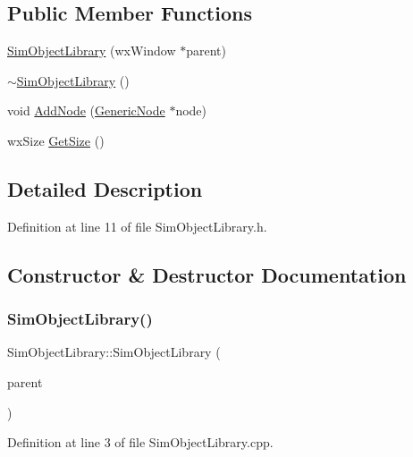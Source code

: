 \subsection*{Public Member Functions}
\begin{DoxyCompactItemize}
\item 
\hyperlink{class_sim_object_library_af0a2f868731e4b807865b88c8e89fed2}{Sim\+Object\+Library} (wx\+Window $\ast$parent)
\item 
\hyperlink{class_sim_object_library_acb3952bfbbb6ad77f8ce34883aa4a23d}{$\sim$\+Sim\+Object\+Library} ()
\item 
void \hyperlink{class_sim_object_library_a52aa03db97b37434b94bbecf73c74e1c}{Add\+Node} (\hyperlink{class_generic_node}{Generic\+Node} $\ast$node)
\item 
wx\+Size \hyperlink{class_sim_object_library_af66daff6ed6fcecb0509e47a97847986}{Get\+Size} ()
\end{DoxyCompactItemize}


\subsection{Detailed Description}


Definition at line 11 of file Sim\+Object\+Library.\+h.



\subsection{Constructor \& Destructor Documentation}
\mbox{\label{class_sim_object_library_af0a2f868731e4b807865b88c8e89fed2}} 
\subsubsection{\texorpdfstring{Sim\+Object\+Library()}{SimObjectLibrary()}}
{\footnotesize\ttfamily Sim\+Object\+Library\+::\+Sim\+Object\+Library (\begin{DoxyParamCaption}\item[{wx\+Window $\ast$}]{parent }\end{DoxyParamCaption})}



Definition at line 3 of file Sim\+Object\+Library.\+cpp.

